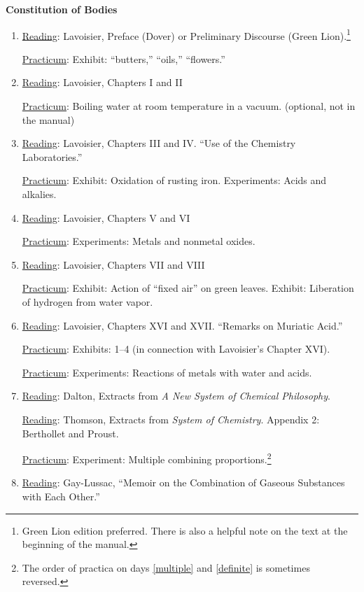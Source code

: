 \documentclass{article}
\newcommand{\rd}{\uline{Reading}}
\newcommand{\pc}{\uline{Practicum}}
\begin{document}
\begin{center}
\textbf{Constitution of Bodies}
\end{center}

\begin{enumerate}
\item \rd: Lavoisier, Preface (Dover) or Preliminary Discourse (Green Lion).\footnote{Green Lion edition preferred. There is also a helpful note on the text at the beginning of the manual.} 

\pc:	Exhibit: ``butters,'' ``oils,'' ``flowers.''

\item \rd: Lavoisier, Chapters I and II  

	\pc: Boiling water at room temperature in a
vacuum. (optional, not in the manual)

\item \rd: Lavoisier, Chapters III and IV. ``Use of the Chemistry Laboratories.''  

	\pc: Exhibit: Oxidation of rusting iron. Experiments:
Acids and alkalies.

\item \rd: Lavoisier, Chapters V and VI  

	\pc: Experiments: Metals and nonmetal oxides.
	
\item \rd: Lavoisier, Chapters VII and VIII  

	\pc: Exhibit: Action of ``fixed
air'' on green leaves. Exhibit: Liberation of hydrogen from water vapor.

\item \rd: Lavoisier, Chapters XVI and XVII. ``Remarks on Muriatic Acid.''  

	\pc: Exhibits: 1--4 (in connection with Lavoisier’s Chapter XVI).
	
	\pc: Experiments: Reactions of metals with water and acids.

\item \rd: Dalton, Extracts from \emph{A New System of Chemical Philosophy}. 

\rd: Thomson, Extracts from \emph{System of Chemistry}.
 Appendix 2: Berthollet and Proust.  

\pc: \label{multiple}Experiment: Multiple combining proportions.\footnote{\label{reversed}The order of practica on days \ref{multiple} and \ref{definite} is sometimes reversed.} %

\item \rd: Gay-Lussac, ``Memoir on the Combination of Gaseous Substances with Each Other.'' 


\end{enumerate}
\end{document}

